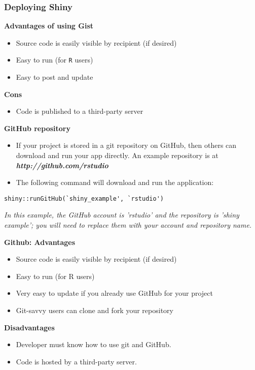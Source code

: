 \documentclass{beamer}
\begin{document}
\begin{frame}
\Large
\frametitle{Deploying Shiny}
\textbf{Advantages of using Gist} 
\begin{itemize}
\item Source code is easily visible by recipient (if desired)
\item Easy to run (for \texttt{R} users)
\item Easy to post and update
\end{itemize} 
\textbf{Cons} \begin{itemize}
\item Code is published to a third-party server
\end{itemize}
\end{frame}

\begin{frame}[fragile]
\Large
\textbf{GitHub repository}
\begin{itemize}
\item If your project is stored in a git repository on GitHub, then others can download and run your app directly. An example repository is at \textit{\textbf{http://github.com/rstudio}}
\item The following command will download and run the application:
\end{itemize}
\large
\begin{framed}
\begin{verbatim}
shiny::runGitHub(`shiny_example', `rstudio')
\end{verbatim}
\end{framed}
\normalsize
\textit{In this example, the GitHub account is 'rstudio' and the repository is 'shiny example'; you will need to replace them with your account and repository name.}
\end{frame}

\begin{frame}
\Large
\textbf{Github: Advantages} \begin{itemize}
\item  Source code is easily visible by recipient (if desired)
\item Easy to run (for R users)
\item Very easy to update if you already use GitHub for your project
\item Git-savvy users can clone and fork your repository
\end{itemize} \textbf{Disadvantages} \begin{itemize}
\item Developer must know how to use git and GitHub.
\item Code is hosted by a third-party server.
\end{itemize}
\end{frame}
\end{document}
